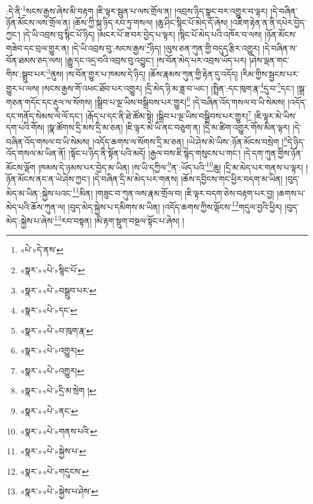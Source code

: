 :དེ་ནི་\footnote{«པེ་»དེ་ནས་}སངས་རྒྱས་ཞེས་མི་བརྟག །ཇི་ལྟར་སྦུན་པ་ལས་གྲོལ་ན། །འབྲས་ཉིད་སྣང་བར་འགྱུར་བ་ལྟར། །དེ་བཞིན་ཉོན་མོངས་ལས་གྲོལ་ན། །ཆོས་ཀྱི་སྐུ་ཉིད་རབ་ཏུ་གསལ། །ཆུ་ཤིང་སྙིང་པོ་མེད་དོ་ཞེས། །འཇིག་རྟེན་ན་ནི་དཔེར་བྱེད་ཀྱང་། །དེ་ཡི་འབྲས་བུ་སྙིང་པོ་ཉིད། །མངར་པོ་ཟ་བར་བྱེད་པ་ལྟར། །སྙིང་པོ་མེད་པའི་འཁོར་བ་ལས། །ཉོན་མོངས་གཟེབ་དང་བྲལ་གྱུར་ན། །དེ་ཡི་འབྲས་བུ་:སངས་རྒྱས་\footnote{«སྣར་»«པེ་»སྙིང་པོ་}ཉིད། །ལུས་ཅན་ཀུན་གྱི་བདུད་རྩིར་འགྱུར། །དེ་བཞིན་ས་བོན་ཐམས་ཅད་ལས། །རྒྱུ་དང་འདྲ་བའི་འབྲས་བུ་འབྱུང་། །ས་བོན་མེད་པར་འབྲས་ཡོད་པར། །ཤེས་ལྡན་གང་གིས་:སྒྲུབ་པར་\footnote{«སྣར་»«པེ་»བསྒྲུབ་པར་}ནུས། །ས་བོན་གྱུར་པ་ཁམས་དེ་ཉིད། །ཆོས་རྣམས་ཀུན་གྱི་རྟེན་དུ་འདོད། །རིམ་གྱིས་སྦྱངས་པར་གྱུར་པ་ལས། །སངས་རྒྱས་གོ་འཕང་ཐོབ་པར་འགྱུར། །དྲི་མེད་ཉི་མ་ཟླ་བ་ཡང་། །སྤྲིན་:དང་ཁུག་རྣ་\footnote{«སྣར་»«པེ་»དང་}དུ་བ་\footnote{«སྣར་»«པེ་»བ་ཁུག་རྣ་}དང་། །སྒྲ་གཅན་གདོང་དང་རྡུལ་ལ་སོགས། །སྒྲིབ་པ་ལྔ་ཡིས་བསྒྲིབས་པར་གྱུར།\footnote{«སྣར་»«པེ་»འགྱུར།} །དེ་བཞིན་འོད་གསལ་བ་ཡི་སེམས། །འདོད་དང་གནོད་སེམས་ལེ་ལོ་དང་། །རྒོད་པ་དང་ནི་ཐེ་ཚོམ་སྟེ། །སྒྲིབ་པ་ལྔ་ཡིས་བསྒྲིབས་པར་གྱུར།\footnote{«སྣར་»«པེ་»འགྱུར།} །ཇི་ལྟར་མེ་ཡིས་དག་པའི་གོས། །སྣ་ཚོགས་དྲི་མས་དྲི་མ་ཅན། །ཇི་ལྟར་མེ་ཡི་ནང་བཅུག་ན། །དྲི་མ་ཚིག་འགྱུར་གོས་མིན་ལྟར། །དེ་བཞིན་འོད་གསལ་བ་ཡི་སེམས། །འདོད་ཆགས་ལ་སོགས་དྲི་མ་ཅན། །ཡེ་ཤེས་མེ་ཡིས་:ཉོན་མོངས་བསྲེག །\footnote{«སྣར་»«པེ་»དྲི་མ་སྲེག །}དེ་ཉིད་འོད་གསལ་མ་ཡིན་ནོ། །སྟོང་པ་ཉིད་ནི་སྟོན་པའི་མདོ། །རྒྱལ་བས་ཇི་སྙེད་གསུངས་པ་གང་། །དེ་དག་ཀུན་གྱིས་ཉོན་མོངས་ལྡོག །ཁམས་དེ་ཉམས་པར་བྱེད་མ་ཡིན། །ས་ཡི་དཀྱིལ་\footnote{«སྣར་»«པེ་»ནང་}ན་:ཡོད་པའི་\footnote{«སྣར་»«པེ་»གནས་པའི་}ཆུ། །དྲི་མ་མེད་པར་གནས་པ་ལྟར། །ཉོན་མོངས་ནང་ན་ཡེ་ཤེས་ཀྱང་། །དེ་བཞིན་དྲི་མ་མེད་པར་གནས། །ཆོས་དབྱིངས་གང་ཕྱིར་བདག་མ་ཡིན། །བུད་མེད་མ་ཡིན་:སྐྱེས་པའང་\footnote{«སྣར་»«པེ་»སྐྱེས་པ་}མིན། །གཟུང་བ་ཀུན་ལས་རྣམ་གྲོལ་བ། །ཇི་ལྟར་བདག་ཅེས་བརྟག་པར་བྱ། །ཆགས་པ་མེད་པའི་ཆོས་ཀུན་ལ། །བུད་མེད་སྐྱེས་པ་དམིགས་མ་ཡིན། །འདོད་ཆགས་ཀྱིས་ལྡོངས་\footnote{«སྣར་»«པེ་»གདུངས་}གདུལ་བྱའི་ཕྱིར། །བུད་མེད་:སྐྱེས་པ་ཞེས་\footnote{«སྣར་»«པེ་»སྐྱེས་པ་ཤེས་}རབ་བསྟན། །མི་རྟག་སྡུག་བསྔལ་སྟོང་པ་ཞེས། །
